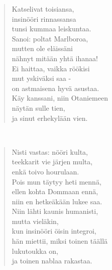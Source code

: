 \noindent\begin{minipage}{\linewidth}
\begin{verse}
	Katselivat toisiansa,\\
	insinööri rinnassansa\\
	tunsi kummaa leiskuntaa.\\
	Sanoi: poltat Marlboroa,\\
	mutten ole eläissäni\\
	nähnyt mitään yhtä ihanaa!\\
	Ei haittaa, vaikka röökisi\\
	mut yskiväksi saa -\\
	on astmaisena hyvä asustaa.\\
	Käy kanssani, niin Otaniemeen\\
	näytän sulle tien,\\
	ja sinut erhekylään vien.\\
\end{verse}
\end{minipage}\\[10pt]
\noindent\begin{minipage}{\linewidth}
\begin{verse}
	Nisti vastas: nööri kulta,\\
	teekkarit vie järjen multa,\\
	enkä toivo hourulaan.\\
	Pois mun täytyy heti mennä,\\
	ellen kohta Dommaan ennä,\\
	niin en hetkeäkään lukee saa.\\
	Niin lähti kaunis humanisti,\\
	mutta vieläkin,\\
	kun insinööri öisin integroi,\\
	hän miettii, miksi toinen täällä\\
	lukutoukka on,\\
	ja toinen nablaa rakastaa.\\
\end{verse}
\end{minipage}\\[10pt]
%
%
